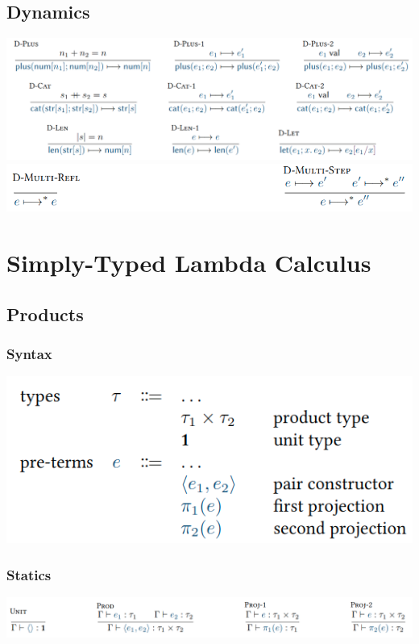 \documentclass[11pt,a4paper,titlepage,dvipsnames,cmyk]{scrartcl}
\begin{document}
\subsection{Dynamics}
\begin{center}
\includegraphics[width=\textwidth]{pics/dynamic-judgement-1.png}
\includegraphics[width=\textwidth]{pics/dynamic-judgement-2.png}
\end{center}

\newpage
\section{Simply-Typed Lambda Calculus}
\subsection{Products}
\subsubsection{Syntax}
\begin{center}
\includegraphics[width=\textwidth/2]{pics/syntax-stlc.png}
\end{center}
\subsubsection{Statics}
\includegraphics[width=\textwidth]{pics/static-stlc.png}
\end{document}
